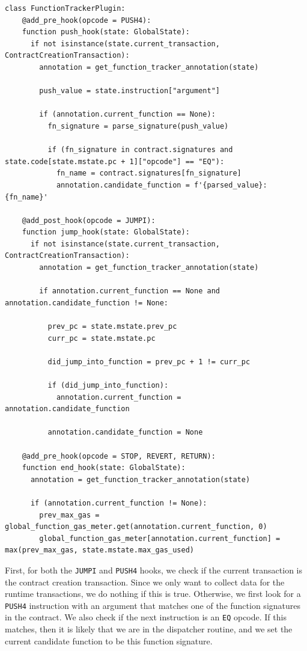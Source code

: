 \begin{lstlisting}[language=Pseudocode, caption={Hooks implemented for function tracker plugin}, label={lst:function_tracker_hooks}, basicstyle=\ttfamily\scriptsize]
  class FunctionTrackerPlugin:
    @add_pre_hook(opcode = PUSH4):
    function push_hook(state: GlobalState):
      if not isinstance(state.current_transaction, ContractCreationTransaction):
        annotation = get_function_tracker_annotation(state)
        
        push_value = state.instruction["argument"]
        
        if (annotation.current_function == None):
          fn_signature = parse_signature(push_value)
      
          if (fn_signature in contract.signatures and state.code[state.mstate.pc + 1]["opcode"] == "EQ"):
            fn_name = contract.signatures[fn_signature]
            annotation.candidate_function = f'{parsed_value}:{fn_name}'
  
    @add_post_hook(opcode = JUMPI):
    function jump_hook(state: GlobalState):
      if not isinstance(state.current_transaction, ContractCreationTransaction):
        annotation = get_function_tracker_annotation(state)

        if annotation.current_function == None and annotation.candidate_function != None:
          
          prev_pc = state.mstate.prev_pc
          curr_pc = state.mstate.pc
          
          did_jump_into_function = prev_pc + 1 != curr_pc
          
          if (did_jump_into_function):
            annotation.current_function = annotation.candidate_function
          
          annotation.candidate_function = None

    @add_pre_hook(opcode = STOP, REVERT, RETURN):
    function end_hook(state: GlobalState):
      annotation = get_function_tracker_annotation(state)
              
      if (annotation.current_function != None):
        prev_max_gas = global_function_gas_meter.get(annotation.current_function, 0)
        global_function_gas_meter[annotation.current_function] = max(prev_max_gas, state.mstate.max_gas_used)
  \end{lstlisting}

First, for both the \texttt{JUMPI} and \texttt{PUSH4} hooks, we check if the current 
transaction is the contract creation transaction. Since we only want to collect data 
for the runtime transactions, we do nothing if this is true. Otherwise, we first look for a
\texttt{PUSH4} instruction with an argument that matches one of the function signatures in the contract.
We also check if the next instruction is an \texttt{EQ} opcode.
If this matches, then it is likely that we are in the dispatcher routine, and we set
the current candidate function to be this function signature.

